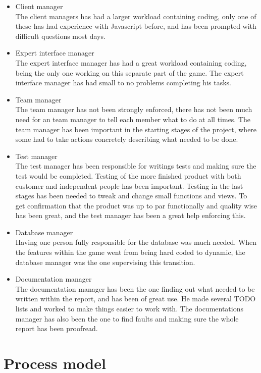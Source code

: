 \begin{itemize}
	\item Client manager\\
The client managers has had a larger workload containing coding, only one of these has had experience with Javascript before, and has been prompted with difficult questions most days.
	\item Expert interface manager\\
The expert interface manager has had a great workload containing coding, being the only one working on this separate part of the game. The expert interface manager has had small to no problems completing his tasks.
	\item Team manager\\
The team manager has not been strongly enforced, there has not been much need for an team manager to tell each member what to do at all times. The team manager has been important in the starting stages of the project, where some had to take actions concretely describing what needed to be done. 
	\item Test manager\\
The test manager has been responsible for writings tests and making sure the test would be completed. Testing of the more finished product with both customer and independent people has been important. Testing in the last stages has been needed to tweak and change small functions and views. To get confirmation that the product was up to par functionally and quality wise has been great, and the test manager has been a great help enforcing this.
	\item Database manager\\
Having one person fully responsible for the database was much needed. When the features within the game went from being hard coded to dynamic, the database manager was the one supervising this transition. 
	\item Documentation manager\\
The documentation manager has been the one finding out what needed to be written within the report, and has been of great use. He made several TODO lists and worked to make things easier to work with. The documentations manager has also been the one to find faults and making sure the whole report has been proofread.
\end{itemize}


\section{Process model}

